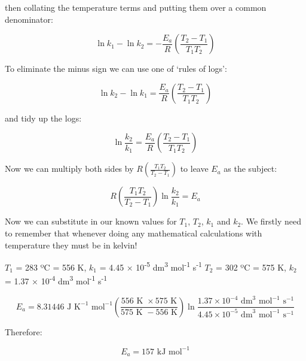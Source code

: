 \documentclass[
]{book}
\begin{document}
then collating the temperature terms and putting them over a common denominator:

\begin{equation*}
\ln {k_1} - \ln {k_2} = -\frac{E_a}{R} \left(\frac{T_2-T_1}{T_1 T_2}  \right)
\end{equation*}

To eliminate the minus sign we can use one of `rules of logs':

\begin{equation*}
\ln {k_2} - \ln {k_1} = \frac{E_a}{R} \left(\frac{T_2-T_1}{T_1 T_2}  \right)
\end{equation*}

and tidy up the logs:

\begin{equation*}
\ln {\frac{k_2}{k_1}} = \frac{E_a}{R} \left(\frac{T_2-T_1}{T_1 T_2}  \right)
\end{equation*}

Now we can multiply both sides by \(R\left(\frac{T_1 T_2}{T_2 - T_1}\right)\) to leave \(E_a\) as the subject:

\begin{equation*}
R\left(\frac{T_1 T_2}{T_2 - T_1}\right)\ln {\frac{k_2}{k_1}} = E_a
\end{equation*}

Now we can substitute in our known values for \(T_1\), \(T_2\), \(k_1\) and \(k_2\). We firstly need to remember that whenever doing any mathematical calculations with temperature they must be in kelvin!

\(T_1\) = 283 ºC = 556 K, \(k_1\) = 4.45 × 10\textsuperscript{-5} dm\textsuperscript{3} mol\textsuperscript{-1} s\textsuperscript{-1}
\(T_2\) = 302 ºC = 575 K, \(k_2\) = 1.37 × 10\textsuperscript{-4} dm\textsuperscript{3} mol\textsuperscript{-1} s\textsuperscript{-1}

\begin{equation*}
E_a = 8.31446 \textrm{ J K}^{-1} \textrm{ mol}^{-1}\left(\frac{556\textrm{ K } \times 575\textrm{ K}}{575\textrm{ K } - 556\textrm{ K}}\right)\ln {\frac{1.37 \times 10^{-4} \textrm{ dm}^3 \textrm{ mol}^{-1} \textrm{ s}^{-1}}{4.45 \times 10^{-5} \textrm{ dm}^3 \textrm{ mol}^{-1} \textrm{ s}^{-1}}}
\end{equation*}

Therefore:

\begin{equation*}
E_a = 157 \textrm{ kJ mol}^{-1}
\end{equation*}
\end{document}
